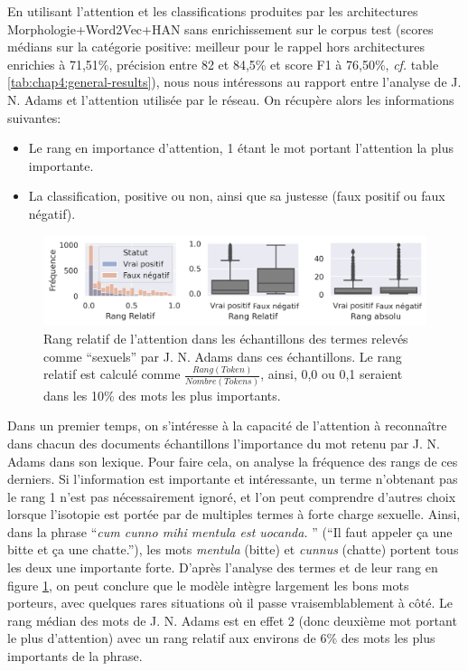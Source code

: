 En utilisant l'attention et les classifications produites par les architectures Morphologie+Word2Vec+HAN sans enrichissement sur le corpus test (scores médians sur la catégorie positive: meilleur pour le rappel hors architectures enrichies à 71,51\%, précision entre 82 et 84,5\% et score F1 à 76,50\%, \textit{cf.} table \ref{tab:chap4:general-results}), nous nous intéressons au rapport entre l'analyse de J. N. Adams et l'attention utilisée par le réseau. On récupère alors les informations suivantes:
\begin{itemize}
    \item Le rang en importance d'attention, 1 étant le mot portant l'attention la plus importante.
    \item La classification, positive ou non, ainsi que sa justesse (faux positif ou faux négatif).
\end{itemize}

\begin{figure}
    \centering
    \includegraphics[width=\linewidth]{figures/chap4/ranksStatus.png}
    \caption{Rang relatif de l'attention dans les échantillons des termes relevés comme \enquote{sexuels} par J. N. Adams dans ces échantillons. Le rang relatif est calculé comme $\frac{Rang(Token)}{Nombre(Tokens)}$, ainsi, 0,0 ou 0,1 seraient dans les 10\% des mots les plus importants.}
    \label{fig:chap4:ranks-attention}
\end{figure}

Dans un premier temps, on s'intéresse à la capacité de l'attention à reconnaître dans chacun des documents échantillons l'importance du mot retenu par J. N. Adams dans son lexique. Pour faire cela, on analyse la fréquence des rangs de ces derniers. Si l'information est importante et intéressante, un terme n'obtenant pas le rang 1 n'est pas nécessairement ignoré, et l'on peut comprendre d'autres choix lorsque l'isotopie est portée par de multiples termes à forte charge sexuelle. Ainsi, dans la phrase \enquote{\textit{cum cunno mihi mentula est uocanda. }} (\enquote{Il faut appeler ça une bitte et ça une chatte.}), les mots \textit{mentula} (bitte) et \textit{cunnus} (chatte) portent tous les deux une importante forte. D'après l'analyse des termes et de leur rang en figure \ref{fig:chap4:ranks-attention}, on peut conclure que le modèle intègre largement les bons mots porteurs, avec quelques rares situations où il passe vraisemblablement à côté. Le rang médian des mots de J. N. Adams est en effet 2 (donc deuxième mot portant le plus d'attention) avec un rang relatif aux environs de 6\% des mots les plus importants de la phrase.


